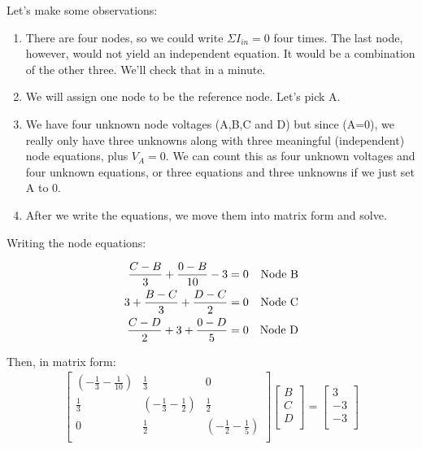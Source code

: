 Let's make some observations:
\begin{enumerate}
\item There are four nodes, so we could write $\Sigma I_{in}=0$ four times. The last node, however, would not yield an independent equation. It would be a combination of the other three. We'll check that in a minute.

\item We will assign one node to be the reference node. Let's pick A.

\item We have four unknown node voltages (A,B,C and D) but since (A=0), we really only have three unknowns along with three meaningful (independent) node equations, plus $V_A=0$. We can count this as four unknown voltages and four unknown equations, or three equations and three unknowns if we just set A to 0.

\item After we write the equations, we move them into matrix form and solve.
\end{enumerate}

Writing the node equations:
\par
\begin{align}
\frac{C-B}{3}+\frac{0-B}{10}-3=0 &&\text{Node B}\notag\\
3 + \frac{B-C}{3}+\frac{D-C}{2}=0 &&\text{Node C}\notag\\
\frac{C-D}{2}+3+\frac{0-D}{5}=0 &&\text{Node D}
\end{align} 

Then, in matrix form:
\begin{align}
\left[ \begin{matrix}
(-\frac{1}{3}-\frac{1}{10})&	\frac{1}{3}&	0\\
\frac{1}{3}&	(-\frac{1}{3}-\frac{1}{2})&\frac{1}{2}\\
0	&	\frac{1}{2}&	(-\frac{1}{2}-\frac{1}{5})\\
\end{matrix} \right]
\left[ \begin{matrix}
B\\
C\\
D\\
\end{matrix} \right] =
\left[ \begin{matrix}
3\\
-3\\
-3\\
\end{matrix} \right]
\end{align}

